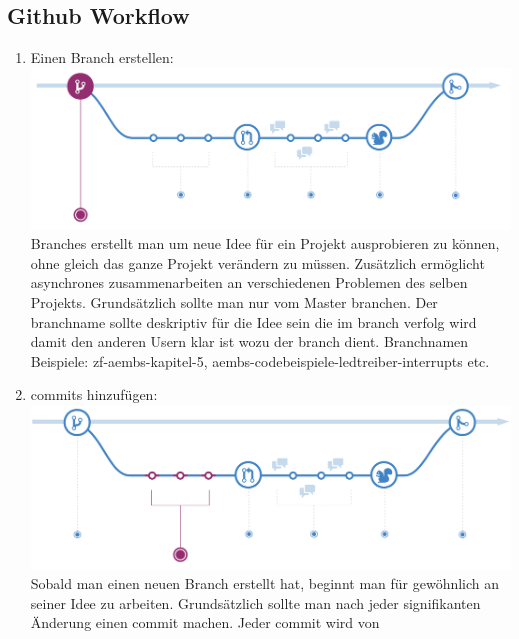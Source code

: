 \documentclass[a4paper, 8pt]{extarticle}
\begin{document}
\begin{multicols*}{3}
            \section{Github Workflow}
                 \begin{enumerate}
                    \item   Einen Branch erstellen:\\
                                \includegraphics[width=1\linewidth, left]{img/git_workflow_createbranch.PNG}\\
                            Branches erstellt man um neue Idee für ein Projekt ausprobieren zu können,
                            ohne gleich das ganze Projekt verändern zu müssen. Zusätzlich ermöglicht
                            asynchrones zusammenarbeiten an verschiedenen Problemen des selben Projekts.
                            Grundsätzlich sollte man nur vom Master branchen.
                            Der branchname sollte deskriptiv für die Idee sein die im branch verfolg wird damit
                            den anderen Usern klar ist wozu der branch dient. Branchnamen Beispiele: zf-aembs-kapitel-5,
                            aembs-codebeispiele-ledtreiber-interrupts etc.
                    \item   commits hinzufügen:\\
                                \includegraphics[width=1\linewidth, left]{img/git_workflow_commits}\\
                            Sobald man einen neuen Branch erstellt hat, beginnt man für gewöhnlich an seiner Idee zu arbeiten.
                            Grundsätzlich sollte man nach jeder signifikanten Änderung einen commit machen. Jeder commit wird von

\end{enumerate}
\end{multicols*}
\end{document}
